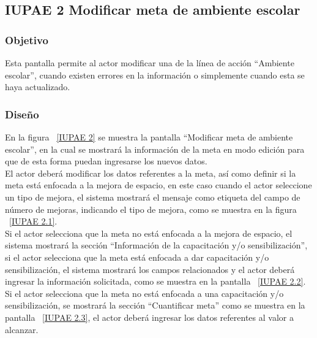 \subsection{IUPAE 2 Modificar meta de ambiente escolar}
                     
\subsubsection{Objetivo}

   Esta pantalla permite al actor modificar una  de la línea de acción ``Ambiente escolar'', cuando existen errores en la información o simplemente cuando esta se haya actualizado.

	
\subsubsection{Diseño}
  En la figura ~\ref{IUPAE 2} se muestra la pantalla ``Modificar meta de ambiente escolar'', en la cual se mostrará la información de la meta en modo edición para que
  de esta forma puedan ingresarse los nuevos datos.\\

  El actor deberá modificar los datos referentes a la meta, así como definir si la meta está enfocada a la mejora de espacio, en este caso 
  cuando el actor seleccione un tipo de mejora, el sistema mostrará el mensaje  como etiqueta del campo de número de mejoras, indicando el tipo de mejora,
  como se muestra en la figura ~\ref{IUPAE 2.1}.\\
  
  Si el actor selecciona que la meta no está enfocada a la mejora de espacio, el sistema mostrará la sección ``Información de la capacitación y/o sensibilización'',
  si el actor selecciona que la meta está enfocada a dar capacitación y/o sensibilización, el sistema mostrará los campos relacionados y
  el actor deberá ingresar la información solicitada, como se muestra en la pantalla ~\ref{IUPAE 2.2}.\\
  
  Si el actor selecciona que la meta no está enfocada a una capacitación y/o sensibilización, se mostrará la sección ``Cuantificar meta'' como se muestra en la pantalla ~\ref{IUPAE 2.3}, el actor 
  deberá ingresar los datos referentes al valor a alcanzar.\\
 
  
